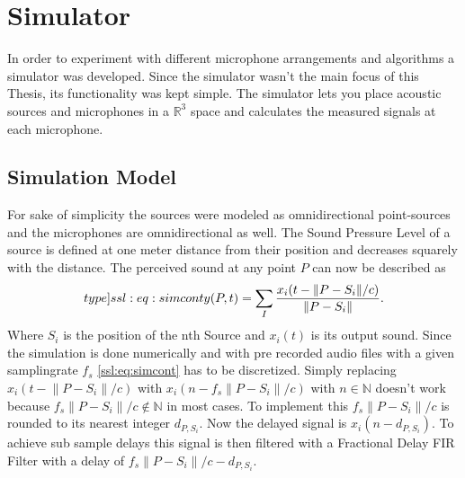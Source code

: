 \newpage
\section{Simulator}
In order to experiment with different microphone arrangements and algorithms a simulator was developed.
Since the simulator wasn't the main focus of this Thesis, its functionality was kept simple.
The simulator lets you place acoustic sources and microphones in a $\mathbb{R}^3$ space and calculates
the measured signals at each microphone.

\subsection{Simulation Model}
For sake of simplicity the sources were modeled as omnidirectional point-sources and the 
microphones are omnidirectional as well.
The Sound Pressure Level of a source is defined at one meter distance from their position and decreases 
squarely with the distance.
The perceived sound at any point $P$ can now be described as
\begin{equation}
  \label[type]{ssl:eq:simcont}
  y(P, t) = \sum_{I} \frac{x_i(t - \lVert P - S_i\rVert/c)}{\lVert P - S_i\rVert}.
\end{equation}
Where $S_i$ is the position of the nth Source and $x_i(t)$ is its output sound.
Since the simulation is done numerically and with pre recorded audio files with a given
samplingrate $f_s$ \eqref{ssl:eq:simcont} has to be discretized.
Simply replacing $x_i(t - \lVert P - S_i\rVert/c)$ with 
$x_i(n - f_s \lVert P - S_i\rVert/c)$ with
$n \in \mathbb{N}$ doesn't work because 
$f_s \lVert P - S_i\rVert/c \not \in \mathbb{N}$ in most cases.
To implement this $f_s \lVert P - S_i\rVert/c$ is rounded to
its nearest integer $d_{P,S_i}$.
Now the delayed signal is $x_i(n - d_{P,S_i})$.
To achieve sub sample delays this signal is then filtered
with a Fractional Delay FIR Filter with a delay of 
$f_s \lVert P - S_i\rVert/c - d_{P,S_i}$.


